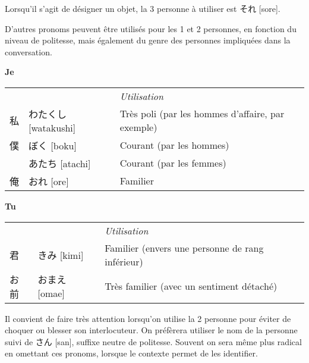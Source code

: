 \documentclass[a4paper,11pt,final]{article}
\newcommand{\sectit}[1]{\bigskip\hspace{-5mm}{\color{sectionblue}$\blacksquare$~~\Large\bfseries #1}}
\newcommand{\romaji}[1]{{\footnotesize[#1]}}
\begin{document}
Lorsqu'il s'agit de désigner un objet, la 3\ieme{} personne à utiliser est それ \romaji{sore}.


\sectit{Autres pronoms}

D'autres pronoms peuvent être utilisés pour les 1\iere{} et 2\ieme{} personnes, en fonction du niveau de politesse, mais également du genre des personnes impliquées dans la conversation.

\textbf{Je}

\vspace{-7mm}
\hspace{5mm}\begin{tabular}{|p{2cm}p{4.5cm}l}
	\multicolumn{1}{l}{}&& \it\small Utilisation \\
	私			& わたくし \romaji{watakushi}			& Très poli (par les hommes d'affaire, par exemple) \\
	僕			& ぼく \romaji{boku}					& Courant (par les hommes) \\
				& あたち \romaji{atachi}				& Courant (par les femmes) \\
	俺			& おれ \romaji{ore}					& Familier
\end{tabular}

\textbf{Tu}

\vspace{-7mm}
\hspace{5mm}\begin{tabular}{|p{2cm}p{4.5cm}l}
	\multicolumn{1}{l}{}&& \it\small Utilisation \\
	君			& きみ \romaji{kimi}					& Familier (envers une personne de rang inférieur) \\
	お前			& おまえ \romaji{omae}				& Très familier (avec un sentiment détaché)
\end{tabular}

Il convient de faire très attention lorsqu'on utilise la 2\ieme{} personne pour éviter de choquer ou blesser son interlocuteur. On préfèrera utiliser le nom de la personne suivi de さん \romaji{san}, suffixe neutre de politesse. Souvent on sera même plus radical en omettant ces pronoms, lorsque le contexte permet de les identifier.
\end{document}
